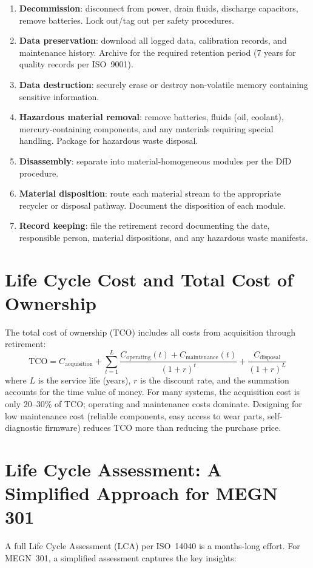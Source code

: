 \documentclass[11pt,letterpaper,twoside,openany]{book}
\begin{document}
\begin{enumerate}[leftmargin=1.5em]
\item \textbf{Decommission}: disconnect from power, drain fluids, discharge capacitors, remove batteries. Lock out/tag out per safety procedures.
\item \textbf{Data preservation}: download all logged data, calibration records, and maintenance history. Archive for the required retention period (7 years for quality records per ISO~9001).
\item \textbf{Data destruction}: securely erase or destroy non-volatile memory containing sensitive information.
\item \textbf{Hazardous material removal}: remove batteries, fluids (oil, coolant), mercury-containing components, and any materials requiring special handling. Package for hazardous waste disposal.
\item \textbf{Disassembly}: separate into material-homogeneous modules per the DfD procedure.
\item \textbf{Material disposition}: route each material stream to the appropriate recycler or disposal pathway. Document the disposition of each module.
\item \textbf{Record keeping}: file the retirement record documenting the date, responsible person, material dispositions, and any hazardous waste manifests.
\end{enumerate}

\section{Life Cycle Cost and Total Cost of Ownership}
The total cost of ownership (TCO) includes all costs from acquisition through retirement:
\begin{equation}
\text{TCO} = C_{\text{acquisition}} + \sum_{t=1}^{L} \frac{C_{\text{operating}}(t) + C_{\text{maintenance}}(t)}{(1+r)^t} + \frac{C_{\text{disposal}}}{(1+r)^L}
\end{equation}
where $L$ is the service life (years), $r$ is the discount rate, and the summation accounts for the time value of money. For many systems, the acquisition cost is only 20--30\% of TCO; operating and maintenance costs dominate. Designing for low maintenance cost (reliable components, easy access to wear parts, self-diagnostic firmware) reduces TCO more than reducing the purchase price.

\section{Life Cycle Assessment: A Simplified Approach for MEGN 301}
A full Life Cycle Assessment (LCA) per ISO~14040 is a months-long effort. For MEGN~301, a simplified assessment captures the key insights:
\end{document}
